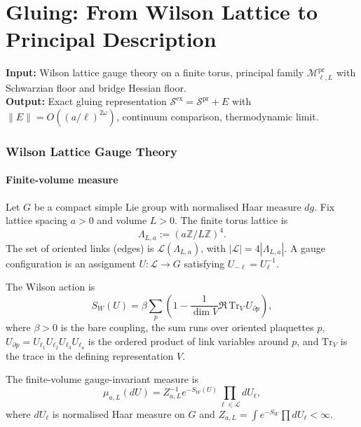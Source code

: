 \documentclass[12pt]{article}
\theoremstyle{plain}
\theoremstyle{definition}
\numberwithin{equation}{section}
\newcommand{\Z}{\mathbb{Z}}
\newcommand{\pr}{\mathrm{pr}}
\newcommand{\ex}{\mathrm{ex}}
\begin{document}

\part{Gluing: From Wilson Lattice to Principal Description}

\noindent\textbf{Input:} Wilson lattice gauge theory on a finite torus, principal family $\mathcal{M}^{\pr}_{\ell,L}$ with Schwarzian floor and bridge Hessian floor.\\
\textbf{Output:} Exact gluing representation $\mathcal{S}^{\ex}=\mathcal{S}^{\pr}+E$ with $\|E\|=O((a/\ell)^{2\omega})$, continuum comparison, thermodynamic limit.

\section{Wilson Lattice Gauge Theory}\label{sec:wilson}

\subsection{Finite-volume measure}

Let $G$ be a compact simple Lie group with normalised Haar measure $dg$.  Fix lattice spacing $a>0$ and volume $L>0$.  The finite torus lattice is
\begin{equation}
\Lambda_{L,a} := (a\Z/L\Z)^4.
\end{equation}
The set of oriented links (edges) is $\mathcal{L}(\Lambda_{L,a})$, with $|\mathcal{L}|=4|\Lambda_{L,a}|$.  A gauge configuration is an assignment $U:\mathcal{L}\to G$ satisfying $U_{-\ell}=U_\ell^{-1}$.

The Wilson action is
\begin{equation}
S_W(U) = \beta\sum_p\left(1-\frac{1}{\dim V}\Re\,\mathrm{Tr}_V\, U_{\partial p}\right),
\end{equation}
where $\beta>0$ is the bare coupling, the sum runs over oriented plaquettes $p$, $U_{\partial p}=U_{\ell_1}U_{\ell_2}U_{\ell_3}U_{\ell_4}$ is the ordered product of link variables around $p$, and $\mathrm{Tr}_V$ is the trace in the defining representation $V$.

The finite-volume gauge-invariant measure is
\begin{equation}
\mu_{a,L}(dU) = Z_{a,L}^{-1}e^{-S_W(U)}\prod_{\ell\in\mathcal{L}} dU_\ell,
\end{equation}
where $dU_\ell$ is normalised Haar measure on $G$ and $Z_{a,L}=\int e^{-S_W}\prod dU_\ell<\infty$.
\end{document}
